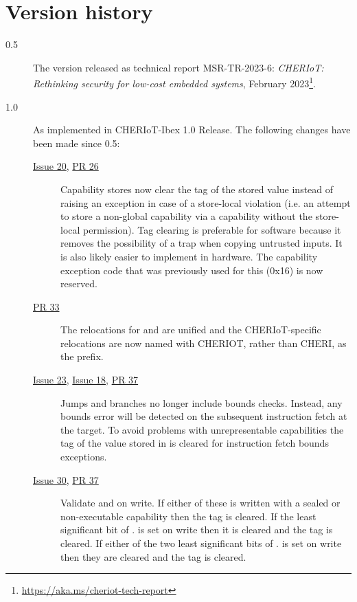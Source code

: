 \newcommand{\ghissue}[1]{\href{https://github.com/CHERIoT-Platform/cheriot-sail/issues/#1}{Issue #1}}
\newcommand{\ghpr}[1]{\href{https://github.com/CHERIoT-Platform/cheriot-sail/pull/#1}{PR #1}}
\chapter{Version history}
\label{chap:changes}

\begin{description}
\item[0.5] The version released as technical report MSR-TR-2023-6: \emph{CHERIoT: Rethinking security for low-cost embedded systems}, February 2023\footnote{\url{https://aka.ms/cheriot-tech-report}}.
\item[1.0] As implemented in CHERIoT-Ibex 1.0 Release. The following changes have been made since 0.5:
  \begin{description}
    \item[\ghissue{20}, \ghpr{26}] Capability stores now clear the tag of the stored value instead of raising an exception in case of a store-local violation
    (i.e. an attempt to store a non-global capability via a capability without the store-local permission).
    Tag clearing is preferable for software because it removes the possibility of a trap when copying untrusted inputs.
    It is also likely easier to implement in hardware.
    The capability exception code that was previously used for this (0x16) is now reserved.
    \item[\ghpr{33}] The relocations for  and  are unified and the CHERIoT-specific relocations are now named with CHERIOT, rather than CHERI, as the prefix.
    \item[\ghissue{23}, \ghissue{18}, \ghpr{37}] Jumps and branches no longer include bounds checks.
    Instead, any \PCC{} bounds error will be detected on the subsequent instruction fetch at the target.
    To avoid problems with unrepresentable capabilities the tag of the value stored in \EPCC{} is cleared for instruction fetch bounds exceptions.
    \item[\ghissue{30}, \ghpr{37}] Validate \MEPCC{} and \MTCC{} on write.
    If either of these is written with a sealed or non-executable capability then the tag is cleared.
    If the least significant bit of \MEPCC{}.\caddress{} is set on write then it is cleared and the tag is cleared.
    If either of the two least significant bits of \MTCC{}.\caddress{} is set on write then they are cleared and the tag is cleared.

\end{description}
\end{description}
